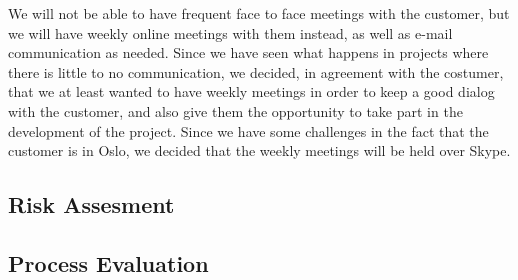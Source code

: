     We will not be able to have frequent face to face meetings with the customer, but we will have weekly online meetings with them instead, as well as e-mail communication as needed. Since we have seen what happens in projects where there is little to no communication, we decided, in agreement with the costumer, that we at least wanted to have weekly meetings in order to keep a good dialog with the customer, and also give them the opportunity to take part in the development of the project. Since we have some challenges in the fact that the customer is in Oslo, we decided that the weekly meetings will be held over Skype.
    
    \subsection{Risk Assesment}\label{risk}
    
    \subsection{Process Evaluation}\label{processevaluation}
    

